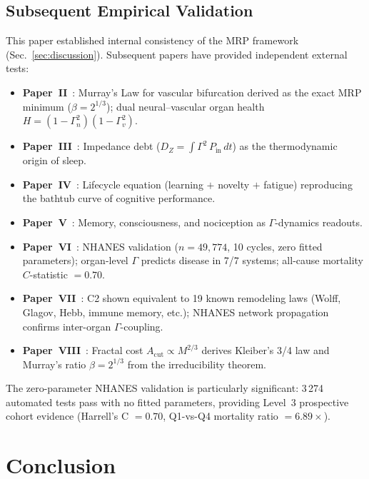 \documentclass[aps,pre,twocolumn,superscriptaddress,floatfix]{revtex4-2}
\newcommand{\Acut}{A_{\text{cut}}}
\begin{document}
\subsection{Subsequent Empirical Validation}
\label{sec:validation}

This paper established internal consistency of the
MRP framework (Sec.~\ref{sec:discussion}).
Subsequent papers have provided independent external tests:
\begin{itemize}
  \item \textbf{Paper~II}~\cite{PaperII}: Murray's Law
    for vascular bifurcation derived as
    the exact MRP minimum ($\beta = 2^{1/3}$);
    dual neural--vascular organ health
    $H = (1-\Gamma_n^2)(1-\Gamma_v^2)$.
  \item \textbf{Paper~III}~\cite{PaperIII}: Impedance debt
    ($D_Z = \int \Gamma^2\,P_{\text{in}}\,dt$) as the
    thermodynamic origin of sleep.
  \item \textbf{Paper~IV}~\cite{PaperIV}: Lifecycle equation
    (learning $+$ novelty $+$ fatigue) reproducing the
    bathtub curve of cognitive performance.
  \item \textbf{Paper~V}~\cite{PaperV}: Memory, consciousness,
    and nociception as $\Gamma$-dynamics readouts.
  \item \textbf{Paper~VI}~\cite{PaperVI}: NHANES validation
    ($n = 49{,}774$, 10 cycles, zero fitted parameters);
    organ-level $\Gamma$ predicts disease in 7/7 systems;
    all-cause mortality $C$-statistic $= 0.70$.
  \item \textbf{Paper~VII}~\cite{PaperVII}: C2 shown equivalent
    to 19 known remodeling laws (Wolff, Glagov, Hebb,
    immune memory, etc.); NHANES network propagation confirms
    inter-organ $\Gamma$-coupling.
  \item \textbf{Paper~VIII}~\cite{PaperVIII}: Fractal cost
    $\Acut \propto M^{2/3}$ derives Kleiber's 3/4 law and
    Murray's ratio $\beta = 2^{1/3}$ from the irreducibility
    theorem.
\end{itemize}

The zero-parameter NHANES validation is particularly
significant: 3\,274 automated tests pass with no
fitted parameters, providing Level~3 prospective
cohort evidence (Harrell's C $= 0.70$,
Q1-vs-Q4 mortality ratio $= 6.89\times$).

\section{Conclusion}
\label{sec:conclusion}
\end{document}
